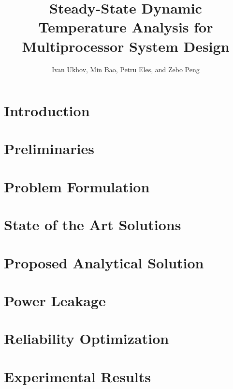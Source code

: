 \documentclass[conference]{IEEEtran}
\title{Steady-State Dynamic Temperature Analysis for Multiprocessor System Design}
\author{Ivan Ukhov, Min Bao, Petru Eles, and Zebo Peng}
\begin{document}
  \maketitle

  \begin{abstract}
    
  \end{abstract}

  \section{Introduction}
  

  \section{Preliminaries} \label{sec:preliminaries}
  

  \section{Problem Formulation} \label{sec:problem}
  

  \section{State of the Art Solutions} \label{sec:hotspot-solution}
  

  \section{Proposed Analytical Solution} \label{sec:analytical-solution}
  

  \section{Power Leakage} \label{sec:leakage}
  

  \section{Reliability Optimization} \label{sec:reliability}
  

  \section{Experimental Results} \label{sec:results}
  
\end{document}
